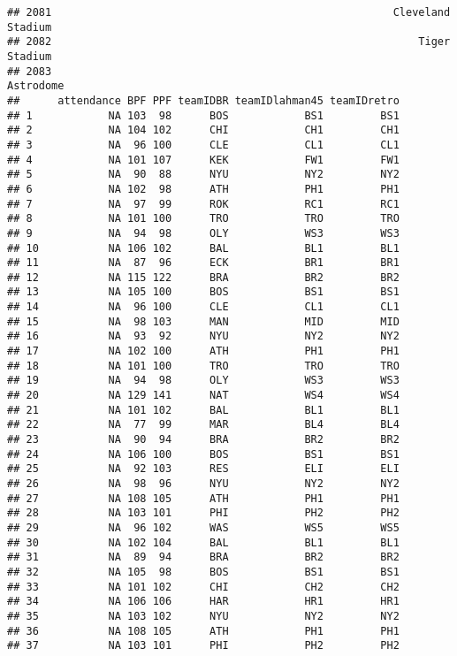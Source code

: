 \documentclass[]{article}
\begin{document}
\begin{verbatim}
## 2081                                                      Cleveland Stadium
## 2082                                                          Tiger Stadium
## 2083                                                              Astrodome
##      attendance BPF PPF teamIDBR teamIDlahman45 teamIDretro
## 1            NA 103  98      BOS            BS1         BS1
## 2            NA 104 102      CHI            CH1         CH1
## 3            NA  96 100      CLE            CL1         CL1
## 4            NA 101 107      KEK            FW1         FW1
## 5            NA  90  88      NYU            NY2         NY2
## 6            NA 102  98      ATH            PH1         PH1
## 7            NA  97  99      ROK            RC1         RC1
## 8            NA 101 100      TRO            TRO         TRO
## 9            NA  94  98      OLY            WS3         WS3
## 10           NA 106 102      BAL            BL1         BL1
## 11           NA  87  96      ECK            BR1         BR1
## 12           NA 115 122      BRA            BR2         BR2
## 13           NA 105 100      BOS            BS1         BS1
## 14           NA  96 100      CLE            CL1         CL1
## 15           NA  98 103      MAN            MID         MID
## 16           NA  93  92      NYU            NY2         NY2
## 17           NA 102 100      ATH            PH1         PH1
## 18           NA 101 100      TRO            TRO         TRO
## 19           NA  94  98      OLY            WS3         WS3
## 20           NA 129 141      NAT            WS4         WS4
## 21           NA 101 102      BAL            BL1         BL1
## 22           NA  77  99      MAR            BL4         BL4
## 23           NA  90  94      BRA            BR2         BR2
## 24           NA 106 100      BOS            BS1         BS1
## 25           NA  92 103      RES            ELI         ELI
## 26           NA  98  96      NYU            NY2         NY2
## 27           NA 108 105      ATH            PH1         PH1
## 28           NA 103 101      PHI            PH2         PH2
## 29           NA  96 102      WAS            WS5         WS5
## 30           NA 102 104      BAL            BL1         BL1
## 31           NA  89  94      BRA            BR2         BR2
## 32           NA 105  98      BOS            BS1         BS1
## 33           NA 101 102      CHI            CH2         CH2
## 34           NA 106 106      HAR            HR1         HR1
## 35           NA 103 102      NYU            NY2         NY2
## 36           NA 108 105      ATH            PH1         PH1
## 37           NA 103 101      PHI            PH2         PH2

\end{verbatim}
\end{document}
